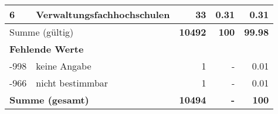 \begin{longtable}{lXrrr}
     6 &
     \multicolumn{1}{X}{ Verwaltungsfachhochschulen   } &


       \num{33} &
       \num[round-mode=places,round-precision=2]{0.31} &
         \num[round-mode=places,round-precision=2]{0.31} \\
     \midrule
     \multicolumn{2}{l}{Summe (gültig)} &
       \textbf{\num{10492}} &
     \textbf{\num{100}} &
       \textbf{\num[round-mode=places,round-precision=2]{99.98}} \\
     \multicolumn{5}{l}{\textbf{Fehlende Werte}}\\
       -998 &
       keine Angabe &
         \num{1} &
        - &
         \num[round-mode=places,round-precision=2]{0.01} \\
       -966 &
       nicht bestimmbar &
         \num{1} &
        - &
         \num[round-mode=places,round-precision=2]{0.01} \\
     \midrule
     \multicolumn{2}{l}{\textbf{Summe (gesamt)}} &
          \textbf{\num{10494}} &
        \textbf{-} &
        \textbf{\num{100}} \\
     \bottomrule
     \end{longtable}
     

